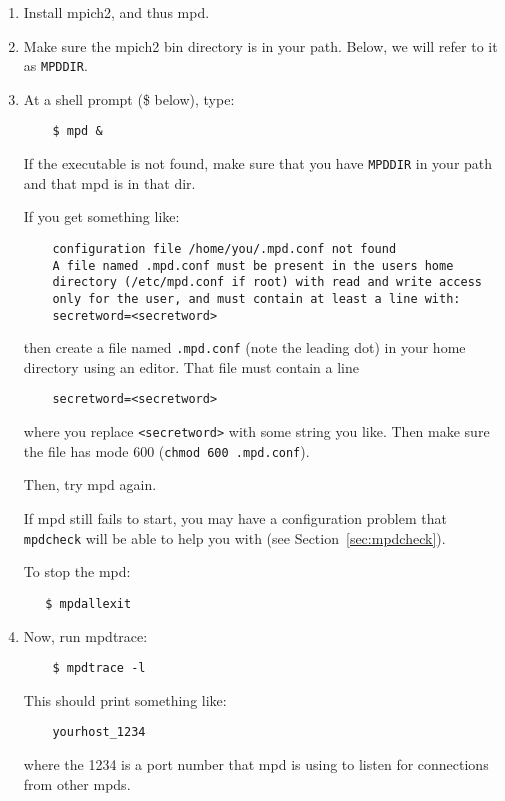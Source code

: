\documentclass[dvipdfm,11pt]{article}
\begin{document}
\begin{enumerate}
\item Install mpich2, and thus mpd.

\item Make sure the mpich2 bin directory is in your path.
Below, we will refer to it as \texttt{MPDDIR}.

\item At a shell prompt (\$ below), type:
\begin{verbatim}
    $ mpd &
\end{verbatim}
If the executable is not found, make sure that you have
\texttt{MPDDIR} in your path and that mpd is in that dir.

If you get something like:
\begin{small}
\begin{verbatim}
    configuration file /home/you/.mpd.conf not found
    A file named .mpd.conf must be present in the users home
    directory (/etc/mpd.conf if root) with read and write access
    only for the user, and must contain at least a line with:
    secretword=<secretword>
\end{verbatim}
\end{small}
then create a file named \texttt{.mpd.conf} (note the leading dot) in your
home directory using an editor.  That file must contain a line
\begin{verbatim}
    secretword=<secretword>
\end{verbatim}
where you replace \verb+<secretword>+ with some string
you like.  Then make sure the file has mode 600 (\texttt{chmod 600 .mpd.conf}).

Then, try mpd again.


If mpd still fails to start, you may have a configuration problem that
\texttt{mpdcheck} will be able to help you with (see
Section~\ref{sec:mpdcheck}).

To stop the mpd:
\begin{verbatim}
   $ mpdallexit
\end{verbatim}


\item Now, run mpdtrace:
\begin{verbatim}
    $ mpdtrace -l
\end{verbatim}

This should print something like:
\begin{verbatim}
    yourhost_1234
\end{verbatim}
where the 1234 is a port number that mpd is using to listen for
connections from other mpds.


\end{enumerate}
\end{document}
